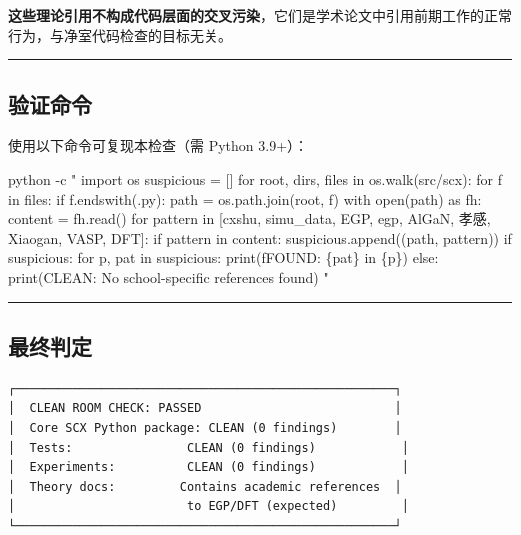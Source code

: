 \documentclass[
  12pt,
]{ctexart}
\newenvironment{Shaded}{}{}
\newcommand{\AttributeTok}[1]{\textcolor[rgb]{0.49,0.56,0.16}{#1}}
\newcommand{\ExtensionTok}[1]{#1}
\newcommand{\StringTok}[1]{\textcolor[rgb]{0.25,0.44,0.63}{#1}}
\begin{document}
\textbf{这些理论引用不构成代码层面的交叉污染}，它们是学术论文中引用前期工作的正常行为，与净室代码检查的目标无关。

\begin{center}\rule{0.5\linewidth}{0.5pt}\end{center}

\subsection{验证命令}\label{ux9a8cux8bc1ux547dux4ee4}

使用以下命令可复现本检查（需 Python 3.9+）：

\begin{Shaded}
\begin{Highlighting}[]
\ExtensionTok{python} \AttributeTok{{-}c} \StringTok{"}
\StringTok{import os}
\StringTok{suspicious = []}
\StringTok{for root, dirs, files in os.walk(\textquotesingle{}src/scx\textquotesingle{}):}
\StringTok{    for f in files:}
\StringTok{        if f.endswith(\textquotesingle{}.py\textquotesingle{}):}
\StringTok{            path = os.path.join(root, f)}
\StringTok{            with open(path) as fh:}
\StringTok{                content = fh.read()}
\StringTok{            for pattern in [\textquotesingle{}cxshu\textquotesingle{}, \textquotesingle{}simu\_data\textquotesingle{}, \textquotesingle{}EGP\textquotesingle{}, \textquotesingle{}egp\textquotesingle{}, \textquotesingle{}AlGaN\textquotesingle{}, \textquotesingle{}孝感\textquotesingle{}, \textquotesingle{}Xiaogan\textquotesingle{}, \textquotesingle{}VASP\textquotesingle{}, \textquotesingle{}DFT\textquotesingle{}]:}
\StringTok{                if pattern in content:}
\StringTok{                    suspicious.append((path, pattern))}
\StringTok{if suspicious:}
\StringTok{    for p, pat in suspicious:}
\StringTok{        print(f\textquotesingle{}FOUND: \{pat\} in \{p\}\textquotesingle{})}
\StringTok{else:}
\StringTok{    print(\textquotesingle{}CLEAN: No school{-}specific references found\textquotesingle{})}
\StringTok{"}
\end{Highlighting}
\end{Shaded}

\begin{center}\rule{0.5\linewidth}{0.5pt}\end{center}

\subsection{最终判定}\label{ux6700ux7ec8ux5224ux5b9a}

\begin{verbatim}
┌─────────────────────────────────────────────────────┐
│  CLEAN ROOM CHECK: PASSED                           │
│  Core SCX Python package: CLEAN (0 findings)        │
│  Tests:                CLEAN (0 findings)            │
│  Experiments:          CLEAN (0 findings)            │
│  Theory docs:         Contains academic references  │
│                        to EGP/DFT (expected)         │
└─────────────────────────────────────────────────────┘
\end{verbatim}
\end{document}
